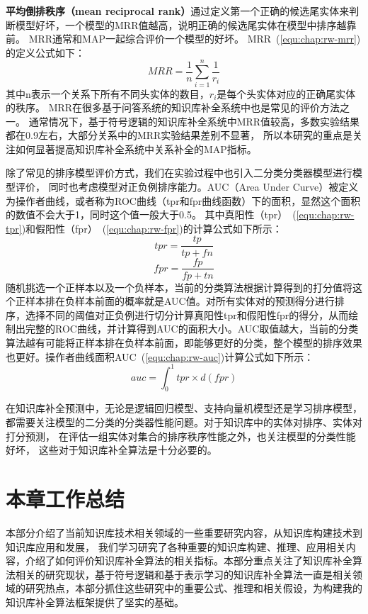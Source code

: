 \textbf{平均倒排秩序（mean reciprocal rank）}通过定义第一个正确的候选尾实体来判断模型好坏，一个模型的MRR值越高，说明正确的候选尾实体在模型中排序越靠前。
MRR通常和MAP一起综合评价一个模型的好坏。
MRR~(\ref{equ:chap:rw-mrr})的定义公式如下：
\begin{equation}
\label{equ:chap:rw-mrr}
MRR=\frac{1}{n} \sum_{i=1}^n \frac{1}{r_i}
\end{equation}
其中n表示一个关系下所有不同头实体的数目，$r_i$是每个头实体对应的正确尾实体的秩序。
MRR在很多基于问答系统的知识库补全系统\cite{West2014}中也是常见的评价方法之一。
通常情况下，基于符号逻辑的知识库补全系统中MRR值较高，多数实验结果都在0.9左右，大部分关系中的MRR实验结果差别不显著，
所以本研究的重点是关注如何显著提高知识库补全系统中关系补全的MAP指标。


除了常见的排序模型评价方式，我们在实验过程中也引入二分类分类器模型进行模型评价，
同时也考虑模型对正负例排序能力。AUC（Area Under Curve）被定义为操作者曲线，或者称为ROC曲线（tpr和fpr曲线函数）下的面积，显然这个面积的数值不会大于1，同时这个值一般大于0.5。
其中真阳性（tpr）~(\ref{equ:chap:rw-tpr})和假阳性（fpr）~(\ref{equ:chap:rw-fpr})的计算公式如下所示：
\begin{equation}
\label{equ:chap:rw-tpr}
tpr=\frac{tp}{tp+fn}
\end{equation}
\begin{equation}
\label{equ:chap:rw-fpr}
fpr=\frac{fp}{fp+tn}
\end{equation}
随机挑选一个正样本以及一个负样本，当前的分类算法根据计算得到的打分值将这个正样本排在负样本前面的概率就是AUC值。对所有实体对的预测得分进行排序，选择不同的阈值对正负例进行切分计算真阳性tpr和假阳性fpr的得分，从而绘制出完整的ROC曲线，并计算得到AUC的面积大小。AUC取值越大，当前的分类算法越有可能将正样本排在负样本前面，即能够更好的分类，整个模型的排序效果也更好。操作者曲线面积AUC~(\ref{equ:chap:rw-auc})计算公式如下所示：
\begin{equation}
\label{equ:chap:rw-auc}
auc=\int_{0}^{1}{tpr}\times d{(fpr)}
\end{equation}

在知识库补全预测中，无论是逻辑回归模型、支持向量机模型还是学习排序模型，
都需要关注模型的二分类的分类器性能问题。对于知识库中的实体对排序、实体对打分预测，
在评估一组实体对集合的排序秩序性能之外，也关注模型的分类性能好坏，
这些对于知识库补全算法是十分必要的。

\section{本章工作总结}

本部分介绍了当前知识库技术相关领域的一些重要研究内容，从知识库构建技术到知识库应用和发展，
我们学习研究了各种重要的知识库构建、推理、应用相关内容，介绍了如何评价知识库补全算法的相关指标。本部分重点关注了知识库补全算法相关的研究现状，基于符号逻辑和基于表示学习的知识库补全算法一直是相关领域的研究热点，本部分抓住这些研究中的重要公式、推理和相关假设，为构建我的知识库补全算法框架提供了坚实的基础。








